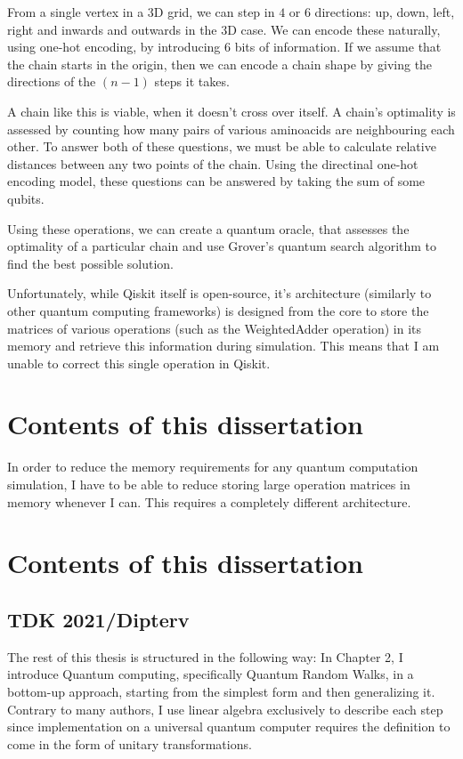 From a single vertex in a 3D grid, we can step in $4$ or $6$ directions: up, down, left, right and inwards and outwards in the 3D case. We can encode these naturally, using one-hot encoding, by introducing $6$ bits of information. If we assume that the chain starts in the origin, then we can encode a chain shape by giving the directions of the $(n-1)$ steps it takes.

A chain like this is viable, when it doesn't cross over itself. A chain's optimality is assessed by counting how many pairs of various aminoacids are neighbouring each other. To answer both of these questions, we must be able to calculate relative distances between any two points of the chain. Using the directinal one-hot encoding model, these questions can be answered by taking the sum of some qubits.

Using these operations, we can create a quantum oracle, that assesses the optimality of a particular chain and use Grover's quantum search algorithm to find the best possible solution.

Unfortunately, while Qiskit itself is open-source, it's architecture (similarly to other quantum computing frameworks) is designed from the core to store the matrices of various operations (such as the WeightedAdder operation) in its memory and retrieve this information during simulation. This means that I am unable to correct this single operation in Qiskit.

\section{Contents of this dissertation}

In order to reduce the memory requirements for any quantum computation simulation, I have to be able to reduce storing large operation matrices in memory whenever I can. This requires a completely different architecture.



\section{Contents of this dissertation}

\subsection{TDK 2021/Dipterv}

The rest of this thesis is structured in the following way: In Chapter 2, I introduce Quantum computing, specifically Quantum Random Walks, in a bottom-up approach, starting from the simplest form and then generalizing it. Contrary to many authors, I use linear algebra exclusively to describe each step since implementation on a universal quantum computer requires the definition to come in the form of unitary transformations.

